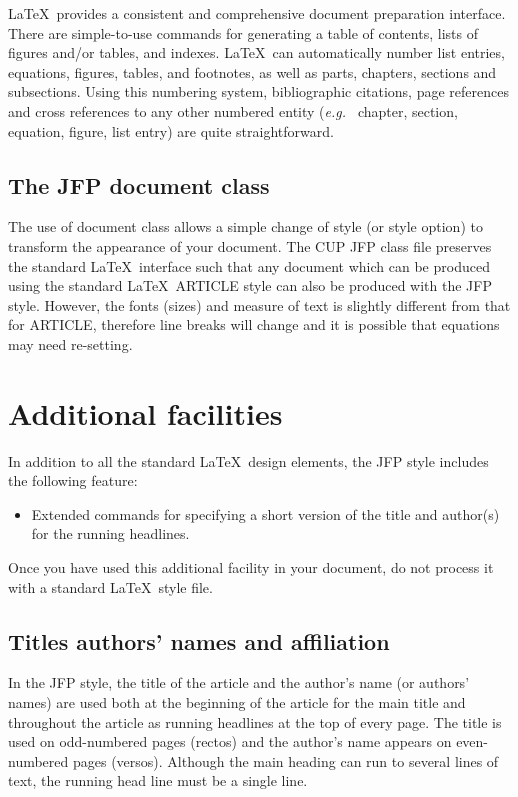 \documentclass{jfp}
\begin{document}
LaTeX\ provides a consistent and comprehensive document preparation
interface. There are simple-to-use commands for generating a table of
contents, lists of figures and/or tables, and indexes. LaTeX\ can
automatically number list entries, equations, figures, tables, and
footnotes, as well as parts, chapters, sections and subsections.
Using this numbering system, bibliographic citations, page references
and cross references to any other numbered entity ({\it e.g.\ } chapter,
section, equation, figure, list entry) are quite straightforward.

\subsection{The JFP document class}

The use of document class allows a simple change of style (or style option)
to transform the appearance of your document. The CUP JFP class file preserves
the standard LaTeX\ interface such that any document which can be produced
using the standard LaTeX\ ARTICLE style can also be produced with the
JFP style. However, the fonts (sizes) and measure of text is slightly different
from that for ARTICLE, therefore line breaks will change and it is possible
that equations may need re-setting.

\section{Additional facilities}

In addition to all the standard LaTeX\ design elements, the JFP style
includes the following feature:
\begin{itemize}
  \item Extended commands for specifying a short version
        of the title and author(s) for the running
        headlines.
\end{itemize}
Once you have used this additional facility in your document,
do not process it with a standard LaTeX\ style file.

\subsection{Titles authors' names and affiliation}

In the JFP style, the title of the article and the author's name (or authors'
names) are used both at the beginning of the article for the main title and
throughout the article as running headlines at the top of every page.
The title is used on odd-numbered pages (rectos) and the author's name appears
on even-numbered pages (versos).
Although the main heading can run to several lines of text, the running head
line must be a single line.
\end{document}
